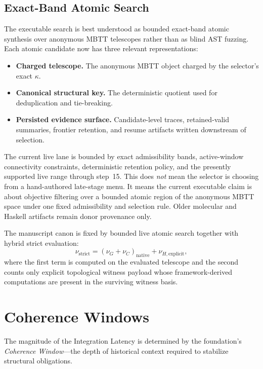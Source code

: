 \documentclass[11pt,a4paper]{article}
\theoremstyle{plain}
\theoremstyle{definition}
\theoremstyle{remark}
\begin{document}
\subsection{Exact-Band Atomic Search}
\label{sec:mdp-mcts}

The executable search is best understood as bounded exact-band atomic synthesis over anonymous MBTT telescopes rather than as blind AST fuzzing.
Each atomic candidate now has three relevant representations:
\begin{itemize}[nosep]
    \item \textbf{Charged telescope.} The anonymous MBTT object charged by the selector's exact $\kappa$.
    \item \textbf{Canonical structural key.} The deterministic quotient used for deduplication and tie-breaking.
    \item \textbf{Persisted evidence surface.} Candidate-level traces, retained-valid summaries, frontier retention, and resume artifacts written downstream of selection.
\end{itemize}

The current live lane is bounded by exact admissibility bands, active-window connectivity constraints, deterministic retention policy, and the presently supported live range through step~15.
This does \emph{not} mean the selector is choosing from a hand-authored late-stage menu.
It means the current executable claim is about objective filtering over a bounded atomic region of the anonymous MBTT space under one fixed admissibility and selection rule.
Older molecular and Haskell artifacts remain donor provenance only.

The manuscript canon is fixed by bounded live atomic search together with hybrid strict evaluation:
\[
  \nu_{\mathrm{strict}} = (\nu_G+\nu_C)_{\mathrm{native}} + \nu_{H,\mathrm{explicit}},
\]
where the first term is computed on the evaluated telescope and the second counts only explicit topological witness payload whose framework-derived computations are present in the surviving witness basis.

\section{Coherence Windows}
\label{sec:coherence}

The magnitude of the Integration Latency is determined by the foundation's \emph{Coherence Window}---the depth of historical context required to stabilize structural obligations.
\end{document}
